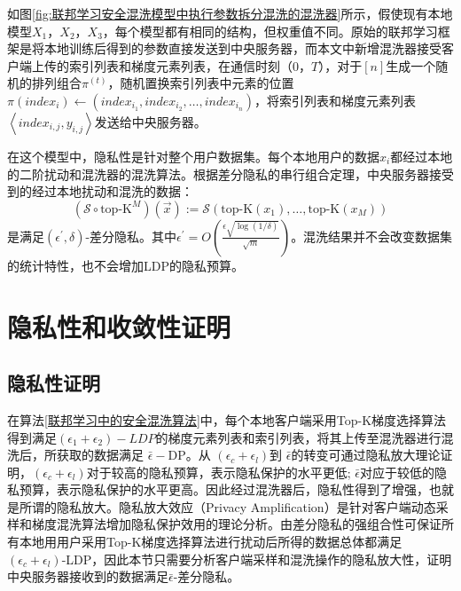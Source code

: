如图\ref{fig:联邦学习安全混洗模型中执行参数拆分混洗的混洗器}所示，假使现有本地模型$X_{1}$，$X_{2}$，$X_{3}$，每个模型都有相同的结构，但权重值不同。原始的联邦学习框架是将本地训练后得到的参数直接发送到中央服务器，而本文中新增混洗器接受客户端上传的索引列表和梯度元素列表，在通信时刻（0，$T$），对于$[n]$生成一个随机的排列组合$\pi^{(t)}$，随机置换索引列表中元素的位置$\pi(index_{i}) \leftarrow\left(index_{i_{1}},index_{i_{2}}, \ldots, index_{i_{n}}\right)$，将索引列表和梯度元素列表$\left\langle index_{i,j}, y_{i,j}\right\rangle$发送给中央服务器。

在这个模型中，隐私性是针对整个用户数据集。每个本地用户的数据$x_{i}$都经过本地的二阶扰动和混洗器的混洗算法。根据差分隐私的串行组合定理，中央服务器接受到的经过本地扰动和混洗的数据：
$$
\left(\mathcal{S} \circ \text{top-K}^{M}\right)(\vec{x}):=\mathcal{S}\left(\text{top-K}\left(x_{1}\right), \ldots, \text{top-K}\left(x_{M}\right)\right)
$$
是满足$\left(\epsilon^{\prime}, \delta\right)$-差分隐私。其中$\epsilon^{\prime}=O\left(\frac{\epsilon \sqrt{\log (1 / \delta)}}{\sqrt{m}}\right)$。混洗结果并不会改变数据集的统计特性，也不会增加LDP的隐私预算。

\section{隐私性和收敛性证明}
\subsection{隐私性证明}
在算法\ref{联邦学习中的安全混洗算法}中，每个本地客户端采用Top-K梯度选择算法得到满足$\left(\epsilon_{1}+\epsilon_{2}\right)-LDP$的梯度元素列表和索引列表，将其上传至混洗器进行混洗后，所获取的数据满足 $\bar{\epsilon}-\mathrm{DP}$。从 $\left(\epsilon_{c}+\epsilon_{l}\right)$到 $\bar{\epsilon} $的转变可通过隐私放大理论证明，$\left(\epsilon_{c}+\epsilon_{l}\right)$对于较高的隐私预算，表示隐私保护的水平更低; $\bar{\epsilon}$对应于较低的隐私预算，表示隐私保护的水平更高。因此经过混洗器后，隐私性得到了增强，也就是所谓的隐私放大。隐私放大效应（Privacy Amplification）是针对客户端动态采样和梯度混洗算法增加隐私保护效用的理论分析。由差分隐私的强组合性可保证所有本地用用户采用Top-K梯度选择算法进行扰动后所得的数据总体都满足$\left(\epsilon_{c}+\epsilon_{l}\right)$-LDP，因此本节只需要分析客户端采样和混洗操作的隐私放大性，证明中央服务器接收到的数据满足$\bar{\epsilon}$-差分隐私。


